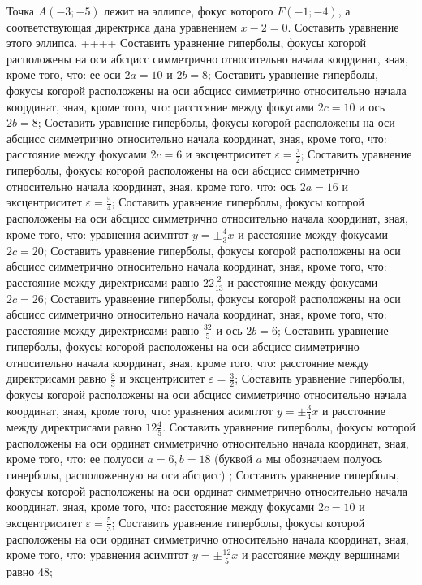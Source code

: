 Точка $A(-3 ;-5)$ лежит на эллипсе, фокус которого $F(-1 ;-4)$, а соответствующая директриса дана уравнением $x-2=0$. Составить уравнение этого эллипса.
++++
Составить уравнение гиперболы, фокусы когорой расположены на оси абсцисс симметрично относительно начала координат, зная, кроме того, что: ее оси $2 a=10$ и $2 b=8$;
Составить уравнение гиперболы, фокусы когорой расположены на оси абсцисс симметрично относительно начала координат, зная, кроме того, что: расстсяние между фокусами $2 c=10$ и ось $2 b=8$;
Составить уравнение гиперболы, фокусы когорой расположены на оси абсцисс симметрично относительно начала координат, зная, кроме того, что: расстояние между фокусами $2 c=6$ и эксцентриситет $\varepsilon=\frac{3}{2}$;
Составить уравнение гиперболы, фокусы когорой расположены на оси абсцисс симметрично относительно начала координат, зная, кроме того, что: ось $2 a=16$ и эксцентриситет $\varepsilon=\frac{5}{4}$;
Составить уравнение гиперболы, фокусы когорой расположены на оси абсцисс симметрично относительно начала координат, зная, кроме того, что: уравнения асимптот $y= \pm \frac{4}{3} x$ и расстояние между фокусами $2 c=20$;
Составить уравнение гиперболы, фокусы когорой расположены на оси абсцисс симметрично относительно начала координат, зная, кроме того, что: расстояние между директрисами равно $22 \frac{2}{13}$ и расстояние между фокусами $2 c=26$;
Составить уравнение гиперболы, фокусы когорой расположены на оси абсцисс симметрично относительно начала координат, зная, кроме того, что: расстояние между директрисами равно $\frac{32}{5}$ и ось $2 b=6$;
Составить уравнение гиперболы, фокусы когорой расположены на оси абсцисс симметрично относительно начала координат, зная, кроме того, что: расстояние между директрисами равно $\frac{8}{3}$ и эксцентриситет $\varepsilon=\frac{3}{2}$;
Составить уравнение гиперболы, фокусы когорой расположены на оси абсцисс симметрично относительно начала координат, зная, кроме того, что: уравнения асимптот $y= \pm \frac{3}{4} x$ и расстояние между директрисами равно $12 \frac{4}{5}$.
Составить уравнение гиперболы, фокусы которой расположены на оси ординат симметрично относительно начала координат, зная, кроме того, что: ее полуоси $a=6, b=18$ (буквой $a$ мы обозначаем полуось гинерболы, расположенную на оси абсцисс) ;
Составить уравнение гиперболы, фокусы которой расположены на оси ординат симметрично относительно начала координат, зная, кроме того, что: расстояние между фокусами $2 c=10$ и эксцентриситет $\varepsilon=\frac{5}{3}$;
Составить уравнение гиперболы, фокусы которой расположены на оси ординат симметрично относительно начала координат, зная, кроме того, что: уравнения асимптот $y= \pm \frac{12}{5} x$ и расстояние между вершинами равно 48;
